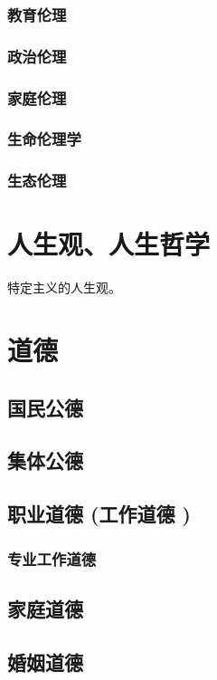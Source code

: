 \documentclass[UTF8]{../RepresentationUniverse}
\begin{document}
        \subsubsection{教育伦理}
        \subsubsection{政治伦理}
        \subsubsection{家庭伦理}
        \subsubsection{生命伦理学}
        \subsubsection{生态伦理}


\section{人生观、人生哲学}
    特定主义的人生观。
    
\section{道德}
    \subsection{国民公德}
    \subsection{集体公德}
    \subsection{职业道德 (工作道德 )}
        \subsubsection{专业工作道德}

    \subsection{家庭道德}
    \subsection{婚姻道德}
\end{document}
